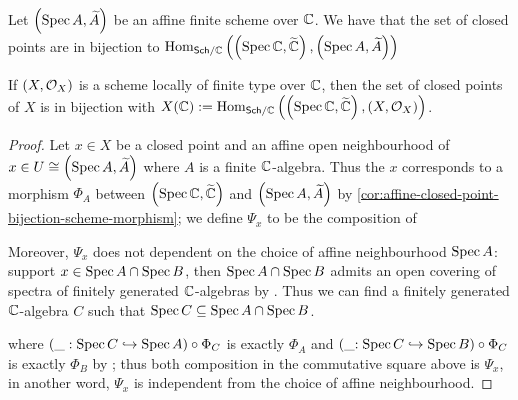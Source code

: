 \begin{corollary}\label{cor:affine-closed-point-bijection-scheme-morphism}
  Let $\left(\operatorname*{Spec}{A}, \widetilde{A}\right)$ be an affine finite scheme over $\mathbb{C}$. We have that the set of closed points are in bijection to $\operatorname{Hom}_{\mathsf{Sch}/\mathbb{C}}{\left(\left(\operatorname*{Spec}{\mathbb{C}}, \widetilde{\mathbb{C}}\right), \left(\operatorname*{Spec}{A}, \widetilde{A}\right)\right)}$
\end{corollary}

\begin{proposition}
  If $\left(X, \mathcal{O}_{X}\right)$ is a scheme locally of finite type over $\mathbb{C}$, then the set of closed points of $X$ is in bijection with $X(\mathbb{C}) := \operatorname{Hom}_{\mathsf{Sch}/\mathbb{C}}\left(\left(\operatorname*{Spec}{\mathbb{C}}, \widetilde{\mathbb{C}}\right), \left(X, \mathcal{O}_{X}\right)\right)$.
\end{proposition}


\begin{proof}
  Let $x \in X$ be a closed point and an affine open neighbourhood of $x \in U \cong \left(\operatorname*{Spec}{A}, \widetilde{A}\right)$ where $A$ is a finite $\mathbb{C}$-algebra. Thus the $x$ corresponds to a morphism $\Phi_{A}$ between $\left(\operatorname*{Spec}{\mathbb{C}}, \widetilde{\mathbb{C}}\right)$ and $\left(\operatorname*{Spec}{A}, \widetilde{A}\right)$ by \cref{cor:affine-closed-point-bijection-scheme-morphism}; we define $\Psi_{x}$ to be the composition of
  \begin{center}
  \end{center}
  Moreover, $\Psi_{x}$ does not dependent on the choice of affine neighbourhood $\operatorname{Spec} A$: support $x \in \operatorname{Spec} A \cap \operatorname{Spec} B$, then $\operatorname{Spec} A \cap \operatorname{Spec} B$ admits an open covering of spectra of finitely generated $\mathbb{C}$-algebras by . Thus we can find a finitely generated $\mathbb{C}$-algebra $C$ such that $\operatorname{Spec} C \subseteq \operatorname{Spec} A \cap \operatorname{Spec} B$.
  \begin{center}
  \end{center}
  where $ (\_: \operatorname{Spec} C \hookrightarrow \operatorname{Spec} A) \circ \Phi_{C}$ is exactly $\Phi_{A}$ and $(\_{: \operatorname{Spec} C \hookrightarrow \operatorname{Spec} B}) \circ \Phi_{C}$ is exactly $\Phi_{B}$ by ; thus both composition in the commutative square above is $\Psi_{x}$, in another word, $\Psi_{x}$ is independent from the choice of affine neighbourhood.


\end{proof}
